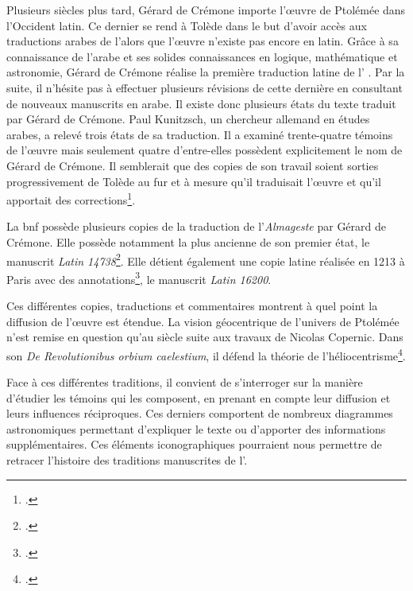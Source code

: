 Plusieurs siècles plus tard, Gérard de Crémone importe l'œuvre de Ptolémée dans l'Occident latin. 
Ce dernier se rend à Tolède dans le but d'avoir accès aux traductions arabes de l'\almageste alors que l'œuvre n'existe pas encore en latin. Grâce à sa connaissance de l'arabe et ses solides connaissances en logique, mathématique et astronomie, Gérard de Crémone réalise la première traduction latine de l' \almageste. Par la suite, il n'hésite pas à effectuer plusieurs révisions de cette dernière en consultant de nouveaux manuscrits en arabe. Il existe donc plusieurs états du texte traduit par Gérard de Crémone. Paul Kunitzsch, un chercheur allemand en études arabes, a relevé trois états de sa traduction. Il a examiné trente-quatre témoins de l'œuvre mais seulement quatre d'entre-elles possèdent explicitement le nom de Gérard de Crémone. Il semblerait que des copies de son travail soient sorties progressivement de Tolède au fur et à mesure qu'il traduisait l'œuvre et qu'il apportait des corrections\footcite{jacquartTraductionsAuFil2018}.

La \gls{bnf} possède plusieurs copies de la traduction de l'\textit{Almageste} par Gérard de Crémone. Elle possède notamment la plus ancienne de son premier état, le manuscrit \textit{Latin 14738}\footcite{jacquartTraductionsAuFil2018}. Elle détient également une copie latine réalisée en 1213 à Paris avec des annotations\footcite{ptolemeeAlmagestum1213}, le manuscrit \textit{Latin 16200}.  

Ces différentes copies, traductions et commentaires montrent à quel point la diffusion de l'œuvre est étendue. La vision géocentrique de l'univers de Ptolémée n'est remise en question qu'au \XVI siècle suite aux travaux de Nicolas Copernic. Dans son \textit{De Revolutionibus orbium caelestium}, il défend la théorie de l'héliocentrisme\footcite{verdetHeliocentrisme2008}.

Face à ces différentes traditions, il convient de s'interroger sur la manière d'étudier les témoins qui les composent, en prenant en compte leur diffusion et leurs influences réciproques. Ces derniers comportent de nombreux diagrammes astronomiques permettant d'expliquer le texte ou d'apporter des informations supplémentaires. Ces éléments iconographiques pourraient nous permettre de retracer l'histoire des traditions manuscrites de l'\almageste.  
